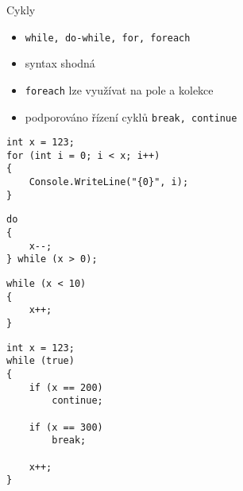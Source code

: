 \begin{frame}[fragile]
\begin{block}{Cykly}
\begin{itemize}
\item \lstinline|while, do-while, for, foreach|
\item syntax shodná
\item \lstinline|foreach| lze využívat na pole a kolekce
\item podporováno řízení cyklů \lstinline|break, continue|
\end{itemize}
\end{block}
\begin{yesblock}
\begin{lstlisting}
int x = 123;
for (int i = 0; i < x; i++) 
{
    Console.WriteLine("{0}", i);
}
\end{lstlisting}
\end{yesblock}
\end{frame}



\begin{frame}[fragile]
\begin{yesblock}
\begin{lstlisting}
do
{
    x--;
} while (x > 0);
\end{lstlisting}
\end{yesblock}

\begin{yesblock}
\begin{lstlisting}
while (x < 10)
{
    x++;
}
\end{lstlisting}
\end{yesblock}
\end{frame}




\begin{frame}[fragile]
\begin{yesblock}
\begin{lstlisting}
int x = 123;
while (true)
{
    if (x == 200)
        continue;

    if (x == 300)
        break;
    
    x++;
}
\end{lstlisting}
\end{yesblock}
\end{frame}





